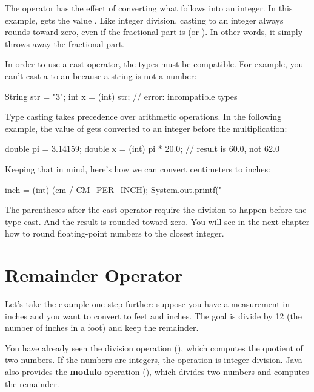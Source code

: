 The  operator has the effect of converting what follows into an integer.
In this example,  gets the value .
Like integer division, casting to an integer always rounds toward zero, even if the fractional part is  (or ).
In other words, it simply throws away the fractional part.

In order to use a cast operator, the types must be compatible.
For example, you can't cast a  to an  because a string is not a number:

\begin{code}
String str = "3";
int x = (int) str;  // error: incompatible types
\end{code}

Type casting takes precedence over arithmetic operations.
In the following example, the value of  gets converted to an integer before the multiplication:

\begin{code}
double pi = 3.14159;
double x = (int) pi * 20.0;  // result is 60.0, not 62.0
\end{code}


Keeping that in mind, here's how we can convert centimeters to inches:

\begin{code}
inch = (int) (cm / CM_PER_INCH);
System.out.printf("%
\end{code}

The parentheses after the cast operator require the division to happen before the type cast.
And the result is rounded toward zero.
You will see in the next chapter how to round floating-point numbers to the closest integer.


\section{Remainder Operator}

Let's take the example one step further: suppose you have a measurement in inches and you want to convert to feet and inches.
The goal is divide by 12 (the number of inches in a foot) and keep the remainder.


You have already seen the division operation (\java{/}), which computes the quotient of two numbers.
If the numbers are integers, the operation is integer division.
Java also provides the {\bf modulo} operation (\java{\%}), which divides two numbers and computes the remainder.

